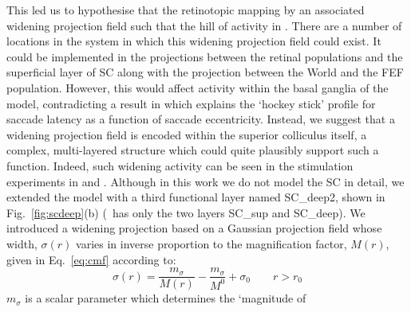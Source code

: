 \documentclass{frontiersSCNS}
\begin{document}
This led us to hypothesise that the retinotopic mapping  by an associated widening projection field such that
the hill of activity in . There are a number of
locations in the system in which this widening projection field could
exist. It could be implemented in the projections between the retinal
populations and the superficial layer of SC along with the projection
between the World and the FEF population. However, this would affect
activity within the basal ganglia of the model, contradicting a result
in \cite{cope_basal_2017} which explains the `hockey stick' profile
for saccade latency as a function of saccade eccentricity. Instead, we
suggest that a widening projection field is encoded within the
superior colliculus itself, a complex, multi-layered structure which
could quite plausibly support such a function. Indeed, such widening
activity can be seen in the stimulation experiments
in \cite{vokoun_intralaminar_2010} and \cite{vokoun_response_2014}.
%
%
Although in this work we do not model
the SC in detail, we extended the model with a third functional layer
named SC\_deep2, shown in Fig.~\ref{fig:scdeep}(b) (\ccg~has only the two
layers SC\_sup and SC\_deep). We introduced a widening projection
based on a Gaussian projection field whose width, $\sigma(r)$ varies
in inverse proportion to the magnification factor, $M(r)$, given in
Eq.~\ref{eq:cmf} according to:
\begin{equation} \label{eq:sigmar}
\sigma(r) = \frac{m_{\sigma}}{M(r)} - \frac{m_{\sigma}}{M^0} + \sigma_0 \qquad r > r_0
\end{equation}
$m_{\sigma}$ is a scalar parameter which determines the `magnitude of
\end{document}
